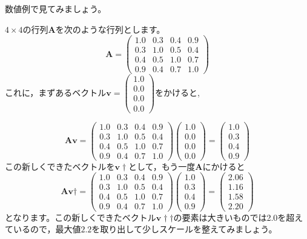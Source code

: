\documentclass{ltjsbook}
\begin{document}
数値例で見てみましょう。

$4\times4$の行列$\bm{A}$を次のような行列とします。
\[ \bm{A}= \begin{pmatrix} 1.0 & 0.3 & 0.4 & 0.9\\ 0.3 & 1.0 & 0.5 & 0.4\\  0.4 & 0.5 & 1.0 & 0.7\\ 0.9 & 0.4 & 0.7 & 1.0 \end{pmatrix} \]
これに，まずあるベクトル$\bm{v} = \begin{pmatrix} 1.0\\ 0.0\\ 0.0\\ 0.0 \end{pmatrix}$をかけると,

\[ \bm{A}\bm{v}=\begin{pmatrix} 1.0 & 0.3 & 0.4 & 0.9\\ 0.3 & 1.0 & 0.5 & 0.4\\  0.4 & 0.5 & 1.0 & 0.7\\ 0.9 & 0.4 & 0.7 & 1.0 \end{pmatrix} \begin{pmatrix} 1.0\\ 0.0\\ 0.0\\ 0.0 \end{pmatrix}= \begin{pmatrix} 1.0\\ 0.3\\ 0.4\\ 0.9 \end{pmatrix}\]
この新しくできたベクトルを$\bm{v}\dagger$として，もう一度$\bm{A}$にかけると
\[ \bm{A}\bm{v}\dagger=\begin{pmatrix} 1.0 & 0.3 & 0.4 & 0.9\\ 0.3 & 1.0 & 0.5 & 0.4\\  0.4 & 0.5 & 1.0 & 0.7\\ 0.9 & 0.4 & 0.7 & 1.0 \end{pmatrix} \begin{pmatrix} 1.0\\ 0.3\\ 0.4\\ 0.9 \end{pmatrix}=\begin{pmatrix} 2.06\\ 1.16\\ 1.58\\ 2.20 \end{pmatrix} \]
となります。この新しくできたベクトル$\bm{v}\dagger\dagger$の要素は大きいものでは2.0を超えているので，最大値$2.2$を取り出して少しスケールを整えてみましょう。
\end{document}
